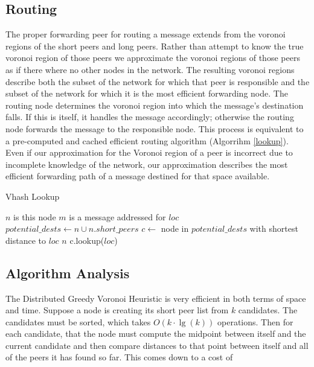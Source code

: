 \documentclass{IEEEtran}
\begin{document}
\subsection{Routing}
The proper forwarding peer for routing a message extends from the voronoi regions of the short peers and long peers.
Rather than attempt to know the true voronoi region of those peers we approximate the voronoi regions of those peers as if there where no other nodes in the network.
The resulting voronoi regions describe both the subset of the network for which that peer is responsible and the subset of the network for which it is the most efficient forwarding node.
The routing node determines the voronoi region into which the message's destination falls.
If this is itself, it handles the message accordingly; otherwise the routing node forwards the message to the responsible node.
This process is equivalent to a pre-computed and cached efficient routing algorithm (Algorrihm \ref{lookup}).
Even if our approximation for the Voronoi region of a peer is incorrect due to incomplete knowledge of the network, our approximation describes the most efficient forwarding path of a message  destined for that space available.

\begin{algorithm}
\caption{Vhash Lookup}
\label{lookup}
\begin{algorithmic}[1] 
	\STATE $n$ is this node
	\STATE $m$ is a message addressed for $loc$
    \STATE $potential\_dests \leftarrow n \cup n.short\_peers$
    \STATE $c \leftarrow $ node in $ potential\_dests$ with shortest distance to $loc$
    	\RETURN $n$
    \ELSE
        \RETURN c.lookup($loc$)
    \ENDIF
\end{algorithmic}
\end{algorithm}



\subsection{Algorithm Analysis}
The Distributed Greedy Voronoi Heuristic is very efficient in both terms of space and time.  Suppose a node is creating its short peer list from $k$ candidates.  The candidates must be sorted, which takes $O(k\cdot\lg(k))$ operations.  Then for each candidate, that the node must compute the midpoint between itself and the current candidate and then compare distances to that point between itself and all of the peers it has found so far.  This comes down to a cost of 
\end{document}
